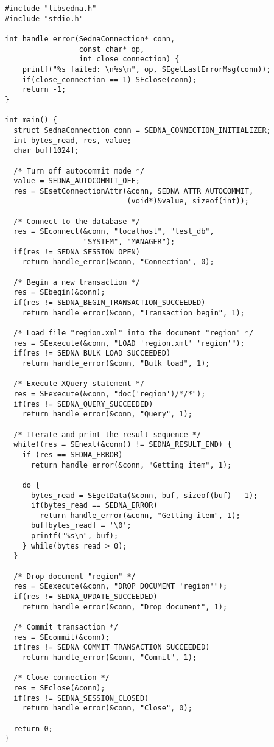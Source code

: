 \documentclass[a4paper,12pt]{article}
\begin{document}
\small{
\begin{verbatim}
#include "libsedna.h"
#include "stdio.h"

int handle_error(SednaConnection* conn,
                 const char* op,
                 int close_connection) {
    printf("%s failed: \n%s\n", op, SEgetLastErrorMsg(conn));
    if(close_connection == 1) SEclose(conn);
    return -1;
}

int main() {
  struct SednaConnection conn = SEDNA_CONNECTION_INITIALIZER;
  int bytes_read, res, value;
  char buf[1024];

  /* Turn off autocommit mode */
  value = SEDNA_AUTOCOMMIT_OFF;
  res = SEsetConnectionAttr(&conn, SEDNA_ATTR_AUTOCOMMIT,
                            (void*)&value, sizeof(int));

  /* Connect to the database */
  res = SEconnect(&conn, "localhost", "test_db",
                  "SYSTEM", "MANAGER");
  if(res != SEDNA_SESSION_OPEN)
    return handle_error(&conn, "Connection", 0);

  /* Begin a new transaction */
  res = SEbegin(&conn);
  if(res != SEDNA_BEGIN_TRANSACTION_SUCCEEDED)
    return handle_error(&conn, "Transaction begin", 1);

  /* Load file "region.xml" into the document "region" */
  res = SEexecute(&conn, "LOAD 'region.xml' 'region'");
  if(res != SEDNA_BULK_LOAD_SUCCEEDED)
    return handle_error(&conn, "Bulk load", 1);

  /* Execute XQuery statement */
  res = SEexecute(&conn, "doc('region')/*/*");
  if(res != SEDNA_QUERY_SUCCEEDED)
    return handle_error(&conn, "Query", 1);

  /* Iterate and print the result sequence */
  while((res = SEnext(&conn)) != SEDNA_RESULT_END) {
    if (res == SEDNA_ERROR)
      return handle_error(&conn, "Getting item", 1);

    do {
      bytes_read = SEgetData(&conn, buf, sizeof(buf) - 1);
      if(bytes_read == SEDNA_ERROR)
        return handle_error(&conn, "Getting item", 1);
      buf[bytes_read] = '\0';
      printf("%s\n", buf);
    } while(bytes_read > 0);
  }

  /* Drop document "region" */
  res = SEexecute(&conn, "DROP DOCUMENT 'region'");
  if(res != SEDNA_UPDATE_SUCCEEDED)
    return handle_error(&conn, "Drop document", 1);

  /* Commit transaction */
  res = SEcommit(&conn);
  if(res != SEDNA_COMMIT_TRANSACTION_SUCCEEDED)
    return handle_error(&conn, "Commit", 1);

  /* Close connection */
  res = SEclose(&conn);
  if(res != SEDNA_SESSION_CLOSED)
    return handle_error(&conn, "Close", 0);

  return 0;
}
\end{verbatim}}
\end{document}
